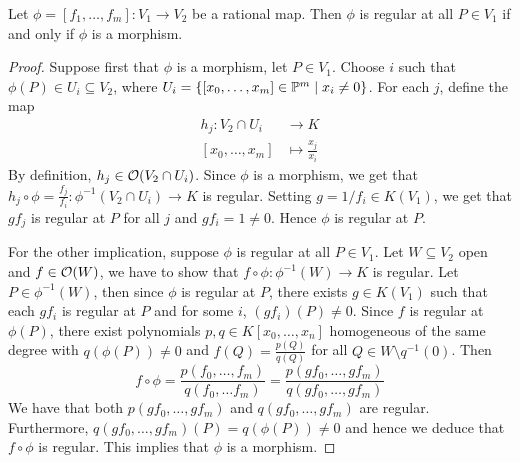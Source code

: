 \begin{proposition}
	Let $\phi = [f_1, \dots, f_m]: V_1 \to V_2$ be a rational map. Then
	$\phi$ is regular at all $P \in V_1$ if and only if
	$\phi$ is a morphism.
\end{proposition}

\begin{proof}
	Suppose first that $\phi$ is a morphism, let $P \in V_1$.
	Choose $i$ such that $\phi(P) \in U_i \subseteq V_2$, 
	where $U_i = \{[x_0, \dots, x_m] \in \mathbb{P}^m \mid x_i \neq 0\}$.
	For each $j$, define the map
	\begin{align*}
		h_j: V_2\cap U_i &\to K\\
		[x_0, \dots, x_m] &\mapsto \frac{x_j}{x_i}
	\end{align*}
	By definition, $h_j \in \mathcal{O}(V_2\cap U_i)$.
	Since $\phi$ is a morphism, we get that
	$h_j \circ \phi = \frac{f_j}{f_i}: \phi^{-1}(V_2\cap U_i) \to K$ is regular.
	Setting $g = 1/f_i \in K(V_1)$, we get that
	$gf_j$ is regular at $P$ for all $j$ and $gf_i = 1 \neq 0$.
	Hence $\phi$ is regular at $P$.

	For the other implication, suppose $\phi$ is regular at all $P \in V_1$.
	Let $W \subseteq V_2$ open and $f \in \mathcal{O}(W)$, we have to show that
	$f\circ\phi: \phi^{-1}(W) \to K$ is regular.
	Let $P \in \phi^{-1}(W)$, then since $\phi$ is regular at $P$,
	there exists $g \in K(V_1)$ such that each $gf_i$ is regular at $P$
	and for some $i$, $(gf_i)(P) \neq 0$.
	Since $f$ is regular at $\phi(P)$, there exist polynomials
	$p, q \in K[x_0, \dots, x_n]$ homogeneous of the same degree
	with $q(\phi(P)) \neq 0$ and 
	$f(Q) = \frac{p(Q)}{q(Q)}$ for all $Q \in W\setminus q^{-1}(0)$. Then
	\begin{equation*}
		f \circ \phi = \frac{p(f_0, \dots, f_m)}{q(f_0, \dots f_m)}
		= \frac{p(gf_0, \dots, gf_m)}{q(gf_0, \dots, gf_m)}
	\end{equation*}
	We have that both $p(gf_0, \dots, gf_m)$ and $q(gf_0, \dots, gf_m)$ are
	regular. Furthermore, $q(gf_0, \dots, gf_m)(P) = q(\phi(P)) \neq 0$
	and hence we deduce that $f\circ \phi$ is regular.
	This implies that $\phi$ is a morphism.
\end{proof}
